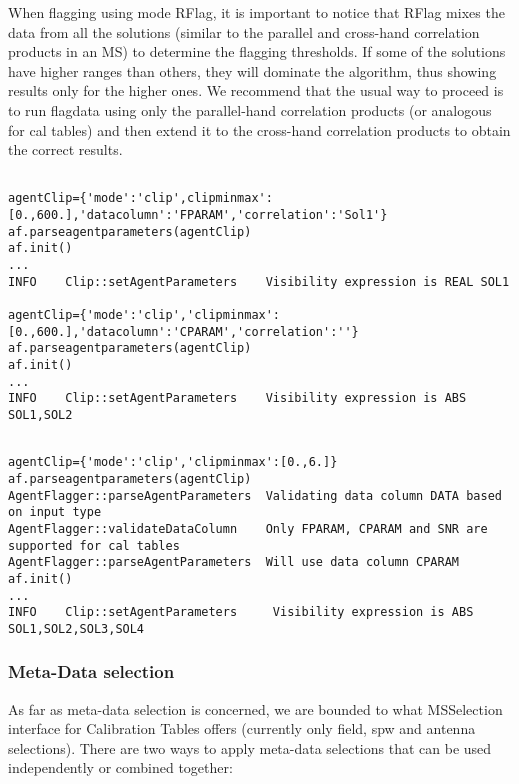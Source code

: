 \begin{enumerate}
When flagging using mode RFlag, it is important to notice that RFlag mixes the data from 
all the solutions (similar to the parallel and cross-hand correlation products in an MS) to 
determine the flagging thresholds. If some of the solutions have higher ranges than others, 
they will dominate the algorithm, thus showing results only for the higher ones. 
We recommend that the usual way to proceed is to run flagdata using only the parallel-hand 
correlation products (or analogous for cal tables) and then extend it to the cross-hand 
correlation products to obtain the correct results. 


\begin{verbatim}

agentClip={'mode':'clip',clipminmax':[0.,600.],'datacolumn':'FPARAM','correlation':'Sol1'}
af.parseagentparameters(agentClip)
af.init()
...
INFO	Clip::setAgentParameters	Visibility expression is REAL SOL1

agentClip={'mode':'clip','clipminmax':[0.,600.],'datacolumn':'CPARAM','correlation':''}
af.parseagentparameters(agentClip)
af.init()
...
INFO	Clip::setAgentParameters	Visibility expression is ABS SOL1,SOL2

\end{verbatim}

\begin{verbatim}

agentClip={'mode':'clip','clipminmax':[0.,6.]}
af.parseagentparameters(agentClip)
AgentFlagger::parseAgentParameters  Validating data column DATA based on input type
AgentFlagger::validateDataColumn    Only FPARAM, CPARAM and SNR are supported for cal tables
AgentFlagger::parseAgentParameters  Will use data column CPARAM
af.init()
...
INFO    Clip::setAgentParameters     Visibility expression is ABS SOL1,SOL2,SOL3,SOL4

\end{verbatim}

\end{enumerate}

\subsubsection{Meta-Data selection}

As far as meta-data selection is concerned, we are bounded to what MSSelection
interface for Calibration Tables offers (currently only field, spw and antenna
selections). There are two ways to apply meta-data selections that can be used
independently or combined together:

